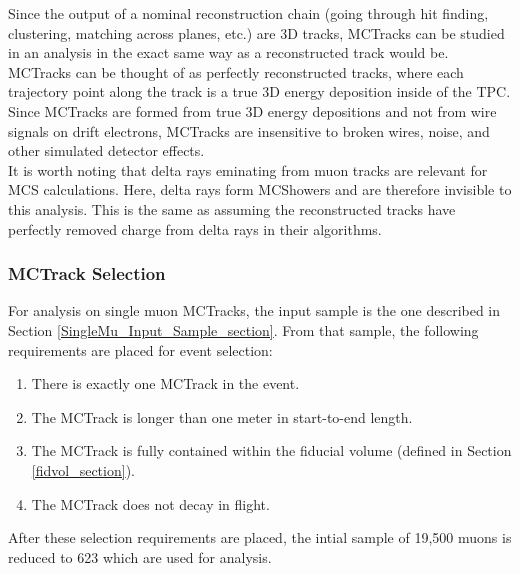 Since the output of a nominal reconstruction chain (going through hit finding, clustering, matching across planes, etc.) are 3D tracks, {\sc MCTracks} can be studied in an analysis in the exact same way as a reconstructed track would be. {\sc MCTracks} can be thought of as perfectly reconstructed tracks, where each trajectory point along the track is a true 3D energy deposition inside of the {\ub} TPC.\\

Since {\sc MCTracks} are formed from true 3D energy depositions and not from wire signals on drift electrons, {\sc MCTracks} are insensitive to broken wires, noise, and other simulated detector effects.\\

It is worth noting that delta rays eminating from muon tracks are relevant for MCS calculations. Here, delta rays form {\sc MCShowers} and are therefore invisible to this analysis. This is the same as assuming the reconstructed tracks have perfectly removed charge from delta rays in their algorithms.

\subsubsection{MCTrack Selection}\label{MCTrack_Selection_section}
For analysis on single muon {\sc MCTracks}, the input sample is the one described in Section \ref{SingleMu_Input_Sample_section}. From that sample, the following requirements are placed for event selection:
\begin{enumerate}
	\item There is exactly one {\sc MCTrack} in the event. %
	\item The {\sc MCTrack} is longer than one meter in start-to-end length. %
	\item The {\sc MCTrack} is fully contained within the fiducial volume (defined in Section \ref{fidvol_section}). %
	\item The {\sc MCTrack} does not decay in flight. %
\end{enumerate}
After these selection requirements are placed, the intial sample of 19,500 muons is reduced to 623 which are used for analysis.

